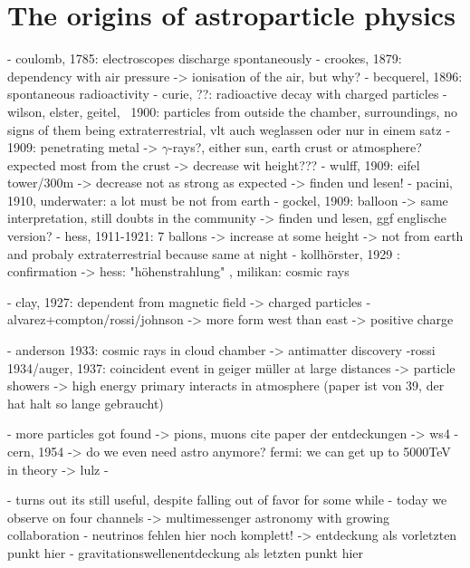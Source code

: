 \section{The origins of astroparticle physics}
- coulomb, 1785: electroscopes discharge spontaneously \cite{??}
- crookes, 1879: dependency with air pressure -> ionisation of the air, but why? 
\cite{doi:10.1098/rstl.1879.0076}
- becquerel, 1896: spontaneous radioactivity
\cite{becquerek1896emission}
- curie, ??: radioactive decay with charged particles
- wilson, elster, geitel, ~1900: particles from outside the chamber,
surroundings, no signs of them being extraterrestrial, 
\cite{??} 
vlt auch weglassen oder nur in einem satz
- 1909: penetrating metal -> $\gamma$-rays?, either sun, earth crust or atmosphere? expected most from the crust -> decrease wit height???
- wulff, 1909: eifel tower/300m -> decrease not as strong as expected
\cite{wulf1909atmosphare} -> finden und lesen!
- pacini, 1910, underwater: a lot must be not from earth
\cite{2011arXiv1101.3015P}
- gockel, 1909: balloon -> same interpretation, still doubts in the community
\cite{gockel1909atmosphare} -> finden und lesen, ggf englische version?
- hess, 1911-1921: 7 ballons 
-> increase at some height 
-> not from earth and probaly extraterrestrial because same at night
\cite{Hess:1912srp}
- kollhörster, 1929 : confirmation
\cite{bothe1929wesen}
-> hess: "höhenstrahlung"  \cite{myssowsky1926versuche},
milikan: cosmic rays \cite{millikan1928origin}

- clay, 1927: dependent from magnetic field -> charged particles
\cite{clay1927penetrating}
- alvarez+compton/rossi/johnson -> more form west than east -> positive charge
\cite{PhysRev.43.835}
\cite{Rossi1933}
\cite{PhysRev.43.834}

- anderson 1933: cosmic rays in cloud chamber -> antimatter discovery
\cite{PhysRev.43.491}
-rossi 1934/auger, 1937: coincident event in geiger müller at large distances -> particle showers -> high energy primary interacts in atmosphere
\cite{PhysRev.45.212}
\cite{RevModPhys.11.288} (paper ist von 39, der hat halt so lange gebraucht)

- more particles got found -> pions, muons
cite paper der entdeckungen -> ws4
- cern, 1954 -> do we even need astro anymore? fermi: we can get up to 5000TeV in theory -> lulz
-

- turns out its still useful, despite falling out of favor for some while
- today we observe on four channels -> multimessenger astronomy with growing collaboration
- neutrinos fehlen hier noch komplett! -> entdeckung als vorletzten punkt hier
- gravitationswellenentdeckung als letzten punkt hier

